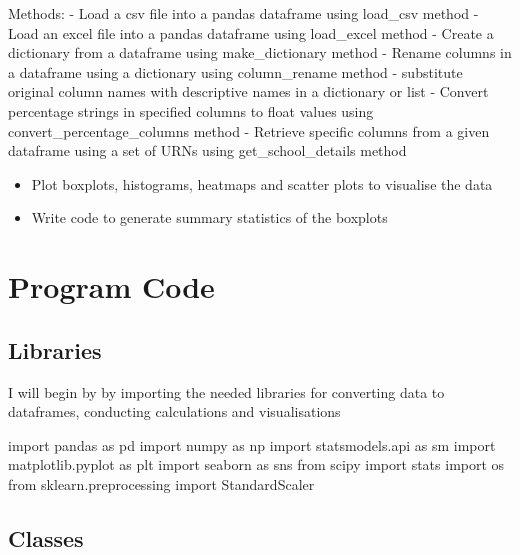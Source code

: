 \documentclass[
  letterpaper,
  DIV=11,
  numbers=noendperiod]{scrartcl}
\newenvironment{Shaded}{\begin{snugshade}}{\end{snugshade}}
\newcommand{\ImportTok}[1]{\textcolor[rgb]{0.00,0.46,0.62}{#1}}
\newcommand{\NormalTok}[1]{\textcolor[rgb]{0.00,0.23,0.31}{#1}}
\providecommand{\tightlist}{%
  \setlength{\itemsep}{0pt}\setlength{\parskip}{0pt}}\usepackage{longtable,booktabs,array}
\begin{document}
Methods: - Load a csv file into a pandas dataframe using load\_csv
method - Load an excel file into a pandas dataframe using load\_excel
method - Create a dictionary from a dataframe using make\_dictionary
method - Rename columns in a dataframe using a dictionary using
column\_rename method - substitute original column names with
descriptive names in a dictionary or list - Convert percentage strings
in specified columns to float values using convert\_percentage\_columns
method - Retrieve specific columns from a given dataframe using a set of
URNs using get\_school\_details method

\begin{itemize}
\tightlist
\item
  Plot boxplots, histograms, heatmaps and scatter plots to visualise the
  data
\item
  Write code to generate summary statistics of the boxplots
\end{itemize}

\section{Program Code}\label{program-code}

\subsection{Libraries}\label{libraries}

I will begin by by importing the needed libraries for converting data to
dataframes, conducting calculations and visualisations

\begin{Shaded}
\begin{Highlighting}[]
\ImportTok{import}\NormalTok{ pandas }\ImportTok{as}\NormalTok{ pd}
\ImportTok{import}\NormalTok{ numpy }\ImportTok{as}\NormalTok{ np}
\ImportTok{import}\NormalTok{ statsmodels.api }\ImportTok{as}\NormalTok{ sm }
\ImportTok{import}\NormalTok{ matplotlib.pyplot }\ImportTok{as}\NormalTok{ plt}
\ImportTok{import}\NormalTok{ seaborn }\ImportTok{as}\NormalTok{ sns}
\ImportTok{from}\NormalTok{ scipy }\ImportTok{import}\NormalTok{ stats}
\ImportTok{import}\NormalTok{ os}
\ImportTok{from}\NormalTok{ sklearn.preprocessing }\ImportTok{import}\NormalTok{ StandardScaler }
\end{Highlighting}
\end{Shaded}

\subsection{Classes}\label{classes}
\end{document}
